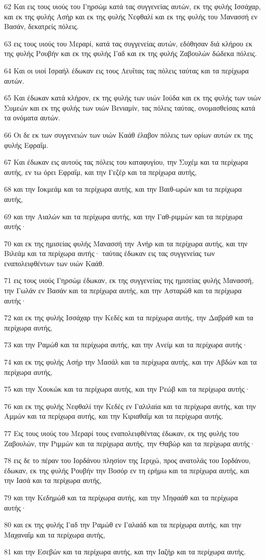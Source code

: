 \par 62 Και εις τους υιούς του Γηρσώμ κατά τας συγγενείας αυτών, εκ της φυλής Ισσάχαρ, και εκ της φυλής Ασήρ και εκ της φυλής Νεφθαλί και εκ της φυλής του Μανασσή εν Βασάν, δεκατρείς πόλεις.
\par 63 εις τους υιούς του Μεραρί, κατά τας συγγενείας αυτών, εδόθησαν διά κλήρου εκ της φυλής Ρουβήν και εκ της φυλής Γαδ και εκ της φυλής Ζαβουλών δώδεκα πόλεις.
\par 64 Και οι υιοί Ισραήλ έδωκαν εις τους Λευΐτας τας πόλεις ταύτας και τα περίχωρα αυτών.
\par 65 Και έδωκαν κατά κλήρον, εκ της φυλής των υιών Ιούδα και εκ της φυλής των υιών Συμεών και εκ της φυλής των υιών Βενιαμίν, τας πόλεις ταύτας, ονομασθείσας κατά τα ονόματα αυτών.
\par 66 Οι δε εκ των συγγενειών των υιών Καάθ έλαβον πόλεις των ορίων αυτών εκ της φυλής Εφραΐμ.
\par 67 Και έδωκαν εις αυτούς τας πόλεις του καταφυγίου, την Συχέμ και τα περίχωρα αυτής, εν τω όρει Εφραΐμ, και την Γεζέρ και τα περίχωρα αυτής,
\par 68 και την Ιοκμεάμ και τα περίχωρα αυτής, και την Βαιθ-ωρών και τα περίχωρα αυτής,
\par 69 και την Αιαλών και τα περίχωρα αυτής, και την Γαθ-ριμμών και τα περίχωρα αυτής·
\par 70 και εκ της ημισείας φυλής Μανασσή την Ανήρ και τα περίχωρα αυτής, και την Βιλεάμ και τα περίχωρα αυτής· ταύτας έδωκαν εις τας συγγενείας των εναπολειφθέντων των υιών Καάθ.
\par 71 εις τους υιούς Γηρσώμ έδωκαν, εκ της συγγενείας της ημισείας φυλής Μανασσή, την Γωλάν εν Βασάν και τα περίχωρα αυτής, και την Ασταρώθ και τα περίχωρα αυτής·
\par 72 και εκ της φυλής Ισσάχαρ την Κεδές και τα περίχωρα αυτής, την Δαβράθ και τα περίχωρα αυτής,
\par 73 και την Ραμώθ και τα περίχωρα αυτής, και την Ανείμ και τα περίχωρα αυτής·
\par 74 και εκ της φυλής Ασήρ την Μασάλ και τα περίχωρα αυτής, και την Αβδών και τα περίχωρα αυτής,
\par 75 και την Χουκώκ και τα περίχωρα αυτής, και την Ρεώβ και τα περίχωρα αυτής·
\par 76 και εκ της φυλής Νεφθαλί την Κεδές εν Γαλιλαία και τα περίχωρα αυτής, και την Αμμών και τα περίχωρα αυτής, και την Κιριαθαΐμ και τα περίχωρα αυτής.
\par 77 Εις τους υιούς του Μεραρί τους εναπολειφθέντας έδωκαν, εκ της φυλής του Ζαβουλών, την Ριμμών και τα περίχωρα αυτής, την Θαβώρ και τα περίχωρα αυτής·
\par 78 εις δε το πέραν του Ιορδάνου πλησίον της Ιεριχώ, προς ανατολάς του Ιορδάνου, έδωκαν, εκ της φυλής Ρουβήν την Βοσόρ εν τη ερήμω και τα περίχωρα αυτής, και την Ιασά και τα περίχωρα αυτής,
\par 79 και την Κεδημώθ και τα περίχωρα αυτής, και την Μηφαάθ και τα περίχωρα αυτής·
\par 80 και εκ της φυλής Γαδ την Ραμώθ εν Γαλαάδ και τα περίχωρα αυτής, και την Μαχαναΐμ και τα περίχωρα αυτής,
\par 81 και την Εσεβών και τα περίχωρα αυτής, και την Ιαζήρ και τα περίχωρα αυτής.

